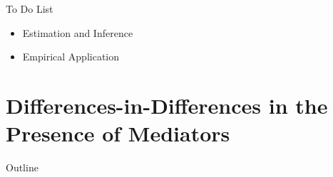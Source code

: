 \documentclass[aspectratio=1610, 9pt]{beamer}
\begin{document}
 






\begin{frame}{To Do List}
      \begin{itemize}
      \item Estimation and Inference
        \item Empirical Application

    \end{itemize}
\end{frame}





\section{Differences-in-Differences in the Presence of Mediators}
\begin{frame}{Outline}
    \tableofcontents[sectionstyle=show/shaded]
\end{frame}
\end{document}
